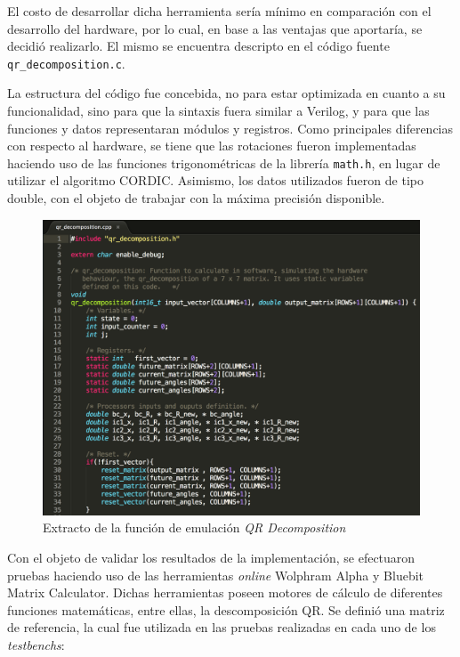 El costo de desarrollar dicha herramienta sería mínimo en comparación con el desarrollo del hardware, por lo cual, en base a las ventajas que aportaría, se decidió realizarlo. El mismo se encuentra descripto en el código fuente \verb;qr_decomposition.c;.

La estructura del código fue concebida, no para estar optimizada en cuanto a su funcionalidad, sino para que la sintaxis fuera similar a Verilog, y para que las funciones y datos representaran módulos y registros. Como principales diferencias con respecto al hardware, se tiene que las rotaciones fueron implementadas haciendo uso de las funciones trigonométricas de la librería \verb;math.h;, en lugar de utilizar el algoritmo CORDIC. Asimismo, los datos utilizados fueron de tipo double, con el objeto de trabajar con la máxima precisión disponible.

\begin{figure}[!h]
  \begin{center}
    \includegraphics[width=14cm]{./figures/C05-qr_decomposition_code}
    \caption{Extracto de la función de emulación \textit{QR Decomposition}}
    \label{fig:qr_decomposition_code}
  \end{center}
\end{figure}

Con el objeto de validar los resultados de la implementación, se efectuaron pruebas haciendo uso de las herramientas \textit{online} Wolphram Alpha y Bluebit Matrix Calculator. Dichas herramientas poseen motores de cálculo de diferentes funciones matemáticas, entre ellas, la descomposición QR. Se definió una matriz de referencia, la cual fue utilizada en las pruebas realizadas en cada uno de los \textit{testbenchs}:

